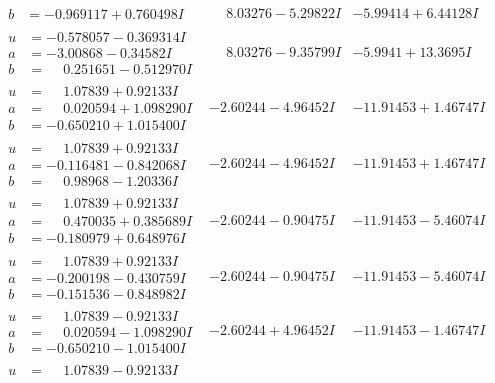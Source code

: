\documentclass[1p]{elsarticle_modified}
\theoremstyle{definition}
\begin{document}
$$\begin{array}{c|c|c}
\begin{aligned}
b &= -0.969117 + 0.760498 I\end{aligned}
 & \phantom{-}8.03276 - 5.29822 I & -5.99414 + 6.44128 I \\ \hline\begin{aligned}
u &= -0.578057 - 0.369314 I \\
a &= -3.00868 - 0.34582 I \\
b &= \phantom{-}0.251651 - 0.512970 I\end{aligned}
 & \phantom{-}8.03276 - 9.35799 I & -5.9941 + 13.3695 I \\ \hline\begin{aligned}
u &= \phantom{-}1.07839 + 0.92133 I \\
a &= \phantom{-}0.020594 + 1.098290 I \\
b &= -0.650210 + 1.015400 I\end{aligned}
 & -2.60244 - 4.96452 I & -11.91453 + 1.46747 I \\ \hline\begin{aligned}
u &= \phantom{-}1.07839 + 0.92133 I \\
a &= -0.116481 - 0.842068 I \\
b &= \phantom{-}0.98968 - 1.20336 I\end{aligned}
 & -2.60244 - 4.96452 I & -11.91453 + 1.46747 I \\ \hline\begin{aligned}
u &= \phantom{-}1.07839 + 0.92133 I \\
a &= \phantom{-}0.470035 + 0.385689 I \\
b &= -0.180979 + 0.648976 I\end{aligned}
 & -2.60244 - 0.90475 I & -11.91453 - 5.46074 I \\ \hline\begin{aligned}
u &= \phantom{-}1.07839 + 0.92133 I \\
a &= -0.200198 - 0.430759 I \\
b &= -0.151536 - 0.848982 I\end{aligned}
 & -2.60244 - 0.90475 I & -11.91453 - 5.46074 I \\ \hline\begin{aligned}
u &= \phantom{-}1.07839 - 0.92133 I \\
a &= \phantom{-}0.020594 - 1.098290 I \\
b &= -0.650210 - 1.015400 I\end{aligned}
 & -2.60244 + 4.96452 I & -11.91453 - 1.46747 I \\ \hline\begin{aligned}
u &= \phantom{-}1.07839 - 0.92133 I \\

\end{aligned}
\end{array}$$
\end{document}
